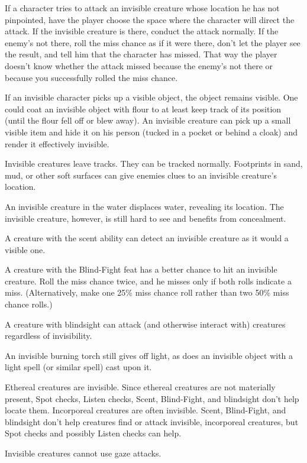 \documentclass{article}
\begin{document}
If a character tries to attack an invisible creature whose location he has not 
pinpointed, have the player choose the space where the character will direct the 
attack. If the invisible creature is there, conduct the attack normally. If the 
enemy's not there, roll the miss chance as if it were there, don't let the player 
see the result, and tell him that the character has missed. That way the player 
doesn't know whether the attack missed because the enemy's not there or because 
you successfully rolled the miss chance.

If an invisible character picks up a visible object, the object remains visible. 
One could coat an invisible object with flour to at least keep track of its position 
(until the flour fell off or blew away). An invisible creature can pick up a small 
visible item and hide it on his person (tucked in a pocket or behind a cloak) and 
render it effectively invisible. 

Invisible creatures leave tracks. They can be tracked normally. Footprints in sand, 
mud, or other soft surfaces can give enemies clues to an invisible creature's location.

An invisible creature in the water displaces water, revealing its location. The 
invisible creature, however, is still hard to see and benefits from concealment.

A creature with the scent ability can detect an invisible creature as it would 
a visible one.

A creature with the Blind-Fight feat has a better chance to hit an invisible creature. 
Roll the miss chance twice, and he misses only if both rolls indicate a miss. (Alternatively, 
make one 25\% miss chance roll rather than two 50\% miss chance rolls.)

A creature with blindsight can attack (and otherwise interact with) creatures regardless 
of invisibility.

An invisible burning torch still gives off light, as does an invisible object with 
a light spell (or similar spell) cast upon it.

Ethereal creatures are invisible. Since ethereal creatures are not materially present, 
Spot checks, Listen checks, Scent, Blind-Fight, and blindsight don't help locate 
them. Incorporeal creatures are often invisible. Scent, Blind-Fight, and blindsight 
don't help creatures find or attack invisible, incorporeal creatures, but Spot 
checks and possibly Listen checks can help.

Invisible creatures cannot use gaze attacks.
\end{document}
